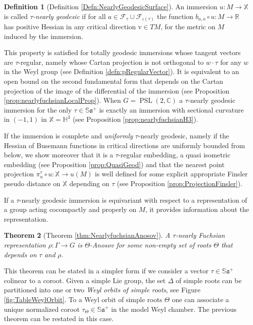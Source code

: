 \documentclass[reqno,10pt]{amsart}
\theoremstyle{plain}
\newtheorem{thm}{Theorem}[section]
\theoremstyle{definition}
\newtheorem{defn}[thm]{Definition}
\theoremstyle{remark}
\newcommand{\type}{\tau}
\newcommand{\R}{\mathbb{R}}
\newcommand{\C}{\mathbb{C}}
\newcommand{\Sph}{\mathbb{S}}
\DeclareMathOperator{\PSL}{PSL}
\newcommand{\X}{\mathbb{X}}
\begin{document}
\begin{defn}[Definition \ref{Defn:NearlyGeodesicSurface}]
\label{Defn:NearlyGeodesicSurfaceIntro}
An immersion $u: M\to \X$ is called \emph{$\type$-nearly geodesic} if for all $a\in \mathcal{F}_\type\cup \mathcal{F}_{\iota(\type)}$  the function $b_{a,o}\circ u: M\to \R$ has positive Hessian in any critical direction $\mathrm{v}\in TM$, for the metric on $M$ induced by the immersion.
\end{defn}

This property is satisfied for totally geodesic immersions whose tangent vectors are $\type$-regular, namely whose Cartan projection is not orthogonal to $w\cdot \type$ for any $w$ in the Weyl group (see Definition \ref{defn:pRegularVector}). It is equivalent to an open bound on the second fundamental form that depends on the Cartan projection of the image of the differential of the immersion (see Proposition \ref{prop:nearlyfuchsianLocalProp}). When $G=\PSL(2,\C)$ a $\type$-nearly geodesic immersion for the only $\type\in\Sph\mathfrak{a}^+$ is exactly an immersion with sectional curvature in $(-1,1)$ in $\X=\mathbb{H}^3$ (see Proposition \ref{prop:nearlyfuchsianH3}).

\medskip

If the immersion is complete and \emph{uniformly} $\type$-nearly geodesic, namely if the Hessian of Busemann functions in critical directions are uniformly bounded from below, we show moreover that it is a $\tau$-regular embedding, a quasi isometric embedding (see Proposition \ref{prop:QuasiGeod}) and that the nearest point projection $\pi^\type_u\circ u:\X\to u(M)$ is well defined for some explicit appropriate Finsler pseudo distance on $\X$ depending on $\type$ (see Proposition \ref{prop:ProjectionFinsler}).

\medskip

If a $\type$-nearly geodesic immersion is equivariant with respect to a representation of a group acting cocompactly and properly on $M$, it provides information about the representation.

\begin{thm}[Theorem \ref{thm:NearlyfuchsianAnosov}]
\label{thm:NearlyfuchsianAnosovIntro}
A $\type$-nearly Fuchsian representation $\rho:\Gamma\to G$ is $\Theta$-Anosov for some non-empty set of roots $\Theta$ that depends on $\type$ and $\rho$.
\end{thm}

This theorem can be stated in a simpler form if we consider a vector $\tau\in \Sph\mathfrak{a}^+$ colinear to a coroot. Given a simple Lie group, the set $\Delta$ of simple roots can be partitioned into one or two \emph{Weyl orbits of simple roots}, see Figure \ref{fig:TableWeylOrbit}. To a Weyl orbit of simple roots $\Theta$ one can associate a unique normalized coroot $\type_\Theta\in \Sph\mathfrak{a}^+$ in the model Weyl chamber. The previous theorem can be restated in this case.
\end{document}
